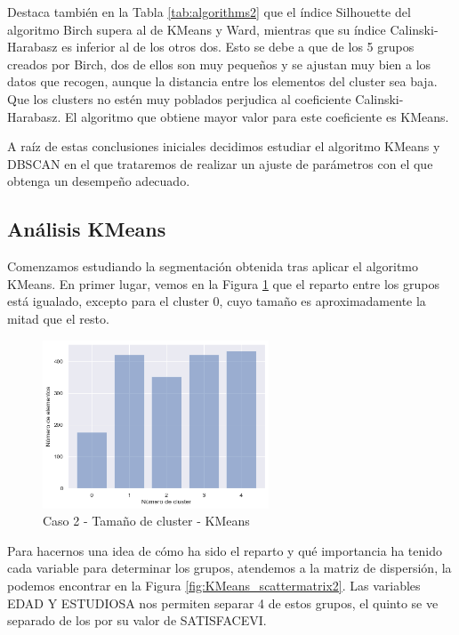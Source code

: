 \documentclass[a4paper, 20pt]{article}
\begin{document}
Destaca también en la Tabla \ref{tab:algorithms2} que el índice Silhouette del algoritmo Birch supera al de KMeans y Ward, mientras que su índice Calinski-Harabasz es inferior al de los otros dos. Esto se debe a que de los 5 grupos creados por Birch, dos de ellos son muy pequeños y se ajustan muy bien a los datos que recogen, aunque la distancia entre los elementos del cluster sea baja. Que los clusters no estén muy poblados perjudica al coeficiente Calinski-Harabasz. El algoritmo que obtiene mayor valor para este coeficiente es KMeans.

A raíz de estas conclusiones iniciales decidimos estudiar el algoritmo KMeans y DBSCAN en el que trataremos de realizar un ajuste de parámetros con el que obtenga un desempeño adecuado.

\subsection{Análisis KMeans}

Comenzamos estudiando la segmentación obtenida tras aplicar el algoritmo KMeans. En primer lugar, vemos en la Figura \ref{fig:KMeans_tam2} que el reparto entre los grupos está igualado, excepto para el cluster 0, cuyo tamaño es aproximadamente la mitad que el resto.

\begin{figure}[H]
    \centering
    \includegraphics[width=0.6\textwidth]{./caso2/KMeans_tam_clusters}
    \caption{Caso 2 - Tamaño de cluster - KMeans}
    \label{fig:KMeans_tam2}
\end{figure}

Para hacernos una idea de cómo ha sido el reparto y qué importancia ha tenido cada variable para determinar los grupos, atendemos a la matriz de dispersión, la podemos encontrar en la Figura \ref{fig:KMeans_scattermatrix2}. Las variables EDAD Y ESTUDIOSA nos permiten separar 4 de estos grupos, el quinto se ve separado de los por su valor de SATISFACEVI.
\end{document}
